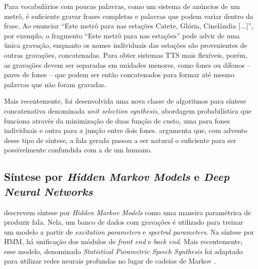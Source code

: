 Para vocabulários com poucas palavras, como um sistema de anúncios de um metrô, é
suficiente gravar frases completas e palavras que podem variar dentro da frase.
Ao enunciar ``Este metrô para nas estações Catete, Glória, Cinelândia [...]'',
por exemplo, o fragmento ``Este metrô para nas estações'' pode advir de uma
única gravação, enquanto os nomes individuais das estações são provenientes de
outras gravações, concatenadas. Para obter sistemas TTS mais flexíveis, porém,
as gravações devem ser separadas em unidades menores, como fones ou dífonos --
 pares de fones -- que podem ser então concatenados para formar até mesmo
palavras que não foram gravadas.

Mais recentemente, foi desenvolvida uma nova classe de algoritmos para
síntese concatenativa denominada \emph{unit selection synthesis}, abordagem
probabilística que funciona através da minimização de duas função de custo, uma
para fones individuais e outra para a junção entre dois fones.
 argumenta que, com advento desse tipo de síntese, a fala
gerada passou a ser natural o suficiente para ser possivelmente confundida com a de um humano.

\subsection{Síntese por \emph{Hidden Markov Models} e \emph{Deep Neural Networks}}
\label{hmmsynthesis}
 descrevem síntese por \emph{Hidden Markov Models} como uma
maneira paramétrica de produzir fala. Nela, um banco de dados com gravações é
utilizado para treinar um modelo a partir de \emph{excitation parameters} e
\emph{spectral parameters}. Na síntese por HMM, há unificação dos módulos de
\emph{front end} e \emph{back end}. Mais recentemente, esse modelo, denominado
\emph{Statistical Parametric Speech Synthesis} foi adaptado para utilizar redes
neurais profundas no lugar de cadeias de Markov \cite{dnngoogle}.


